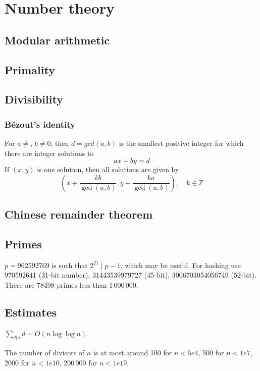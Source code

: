 
\chapter{Number theory}

\section{Modular arithmetic}

\section{Primality}

\section{Divisibility}
	\subsection{Bézout's identity}
	For $a \neq $, $b \neq 0$, then $d=gcd(a,b)$ is the smallest positive integer for which there are integer solutions to
	$$ax+by=d$$
	If $(x,y)$ is one solution, then all solutions are given by
	$$\left(x+\frac{kb}{\gcd(a,b)}, y-\frac{ka}{\gcd(a,b)}\right), \quad k\in\mathbb{Z}$$


\columnbreak

\section{Chinese remainder theorem}

\section{Primes}
	$p=962592769$ is such that $2^{21} \mid p-1$, which may be useful. For hashing
	use 970592641 (31-bit number), 31443539979727 (45-bit), 3006703054056749
	(52-bit). There are 78498 primes less than 1\,000\,000.

\section{Estimates}
	$\sum_{d|n} d = O(n \log \log n)$.

	The number of divisors of $n$ is at most around 100 for $n < 5e4$, 500 for $n < 1e7$, 2000 for $n < 1e10$, 200\,000 for $n < 1e19$.

\hardcolumnbreak
